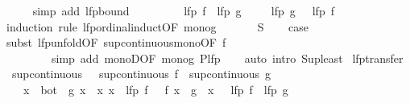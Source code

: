 \begin{isabellebody}
\ \ \ \ \isamarkupfalse%
\ {\isacharparenleft}simp\ add{\isacharcolon}\ lfp{\isacharunderscore}bound{\isacharparenright}\isanewline
\ \ \isamarkupfalse%
\isanewline
\ \ \isamarkupfalse%
\ \isamarkupfalse%
\ {\isachardoublequoteopen}{\isasymalpha}\ {\isacharparenleft}lfp\ f{\isacharparenright}\ {\isasymle}\ lfp\ g{\isachardoublequoteclose}\ \isacommand{{\isachardot}}\isamarkupfalse%
\isanewline
\isanewline
\ \ \isamarkupfalse%
\ {\isachardoublequoteopen}lfp\ g\ {\isasymle}\ {\isasymalpha}\ {\isacharparenleft}lfp\ f{\isacharparenright}{\isachardoublequoteclose}\isanewline
\ \ \isamarkupfalse%
\ {\isacharparenleft}induction\ rule{\isacharcolon}\ lfp{\isacharunderscore}ordinal{\isacharunderscore}induct{\isacharbrackleft}OF\ mono{\isacharunderscore}g{\isacharbrackright}{\isacharparenright}\isanewline
\ \ \ \ \isamarkupfalse%
\ {\isacharparenleft}{}\ S{\isacharparenright}\ \isamarkupfalse%
\ \isamarkupfalse%
\ {\isacharquery}case\isanewline
\ \ \ \ \ \ \isamarkupfalse%
\ {\isacharparenleft}subst\ lfp{\isacharunderscore}unfold{\isacharbrackleft}OF\ sup{\isacharunderscore}continuous{\isacharunderscore}mono{\isacharbrackleft}OF\ f{\isacharbrackright}{\isacharbrackright}{\isacharparenright}\isanewline
\ \ \ \ \ \ \ \ \ {\isacharparenleft}simp\ add{\isacharcolon}\ monoD{\isacharbrackleft}OF\ mono{\isacharunderscore}g{\isacharbrackright}\ P{\isacharunderscore}lfp{\isacharparenright}\isanewline
\ \ \isamarkupfalse%
\ {\isacharparenleft}auto\ intro{\isacharcolon}\ Sup{\isacharunderscore}least{\isacharparenright}\isanewline
{}\isamarkupfalse%
%
\endisatagproof
{\isafoldproof}%
%
\isadelimproof
\isanewline
%
\endisadelimproof
\isanewline
{}\isamarkupfalse%
\ lfp{\isacharunderscore}transfer{\isacharcolon}\isanewline
\ \ {\isachardoublequoteopen}sup{\isacharunderscore}continuous\ {\isasymalpha}\ {\isasymLongrightarrow}\ sup{\isacharunderscore}continuous\ f\ {\isasymLongrightarrow}\ sup{\isacharunderscore}continuous\ g\ {\isasymLongrightarrow}\isanewline
\ \ \ \ {\isacharparenleft}{\isasymAnd}x{\isachardot}\ {\isasymalpha}\ bot\ {\isasymle}\ g\ x{\isacharparenright}\ {\isasymLongrightarrow}\ {\isacharparenleft}{\isasymAnd}x{\isachardot}\ x\ {\isasymle}\ lfp\ f\ {\isasymLongrightarrow}\ {\isasymalpha}\ {\isacharparenleft}f\ x{\isacharparenright}\ {\isacharequal}\ g\ {\isacharparenleft}{\isasymalpha}\ x{\isacharparenright}{\isacharparenright}\ {\isasymLongrightarrow}\ {\isasymalpha}\ {\isacharparenleft}lfp\ f{\isacharparenright}\ {\isacharequal}\ lfp\ g{\isachardoublequoteclose}\isanewline

\end{isabellebody}
